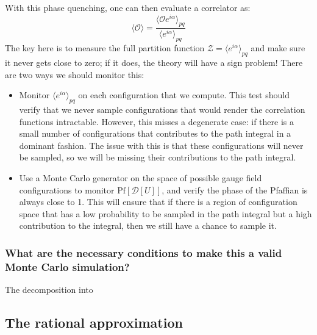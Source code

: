 With this phase quenching, one can then evaluate a correlator as:
\begin{equation}
    \langle\mathcal O \rangle = \frac{\langle \mathcal O e^{i\alpha} \rangle_{pq}}{\langle e^{i\alpha} \rangle_{pq}}
\end{equation}
The key here is to measure the full partition function $\mathcal Z = \langle e^{i\alpha}\rangle_{pq}$ and make sure it never gets close to zero; if it does, the theory will have a sign problem! There are two ways we should monitor this:
\begin{itemize}
	\item Monitor $\langle e^{i\alpha}\rangle_{pq}$ on each configuration that we compute. This test should verify that we never sample configurations that would render the correlation functions intractable. However, this misses a degenerate case: if there is a small number of configurations that contributes to the path integral in a dominant fashion. The issue with this is that these configurations will never be sampled, so we will be missing their contributions to the path integral.
	\item Use a Monte Carlo generator on the space of possible gauge field configurations to monitor $\mathrm{Pf}[\mathcal D[U]]$, and verify the phase of the Pfaffian is always close to 1. This will ensure that if there is a region of configuration space that has a low probability to be sampled in the path integral but a high contribution to the integral, then we still have a chance to sample it. 
\end{itemize}

\subsubsection{What are the necessary conditions to make this a valid Monte Carlo simulation?}

The decomposition into 

\subsection{The rational approximation}

